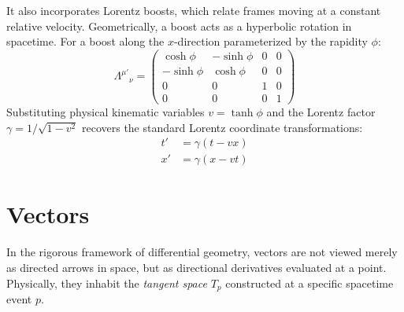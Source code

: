 \documentclass[11pt, a4paper]{report}
\begin{document}
It also incorporates Lorentz boosts, which relate frames moving at a constant relative velocity. Geometrically, a boost acts as a hyperbolic rotation in spacetime. For a boost along the $x$-direction parameterized by the rapidity $\phi$:
\begin{equation}\label{eq:boost-matrix}
{\Lambda^{\mu'}}_{\nu} =
\begin{pmatrix}
\cosh\phi & -\sinh\phi & 0 & 0 \\
-\sinh\phi & \cosh\phi & 0 & 0 \\
0 & 0 & 1 & 0 \\
0 & 0 & 0 & 1
\end{pmatrix}
\end{equation}
Substituting physical kinematic variables $v = \tanh\phi$ and the Lorentz factor $\gamma = 1/\sqrt{1-v^2}$ recovers the standard Lorentz coordinate transformations:
\begin{align}
t' &= \gamma(t - vx) \label{eq:lorentz-tprime} \\
x' &= \gamma(x - vt) \label{eq:lorentz-xprime}
\end{align}

\section{Vectors}
In the rigorous framework of differential geometry, vectors are not viewed merely as directed arrows in space, but as directional derivatives evaluated at a point. Physically, they inhabit the \emph{tangent space} $T_p$ constructed at a specific spacetime event $p$.
\end{document}
